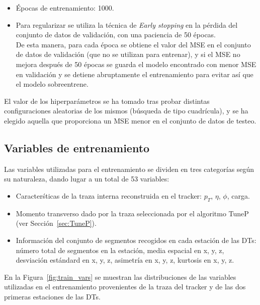 \begin{itemize}
\item \'Epocas de entrenamiento: 1000.

\item Para regularizar se utiliza la t\'ecnica de \textit{Early stopping} en la p\'erdida del conjunto de datos de validaci\'on, con una paciencia de 50 \'epocas. \\
De esta manera, para cada \'epoca se obtiene el valor del MSE en el conjunto de datos de validaci\'on (que no se utilizan para entrenar), y si el MSE no mejora despu\'es de 50 \'epocas se guarda el modelo encontrado con menor MSE en validaci\'on y se detiene abruptamente el entrenamiento para evitar as\'i que el modelo sobreentrene. 

\end{itemize}

El valor de los hiperpar\'ametros se ha tomado tras probar distintas configuraciones aleatorias de los mismos (b\'usqueda de tipo cuadr\'icula), y se ha elegido aquella que proporciona un MSE menor en el conjunto de datos de testeo.


\subsection{Variables de entrenamiento}\label{sec:variables}

Las variables utilizadas para el entrenamiento se dividen en tres categor\'ias seg\'un su naturaleza, dando lugar a un total de 53 variables:

\begin{itemize}
\item Caracter\'sticas de la traza interna reconstruida en el tracker: $p_{T}$, $\eta$, $\phi$, carga.
\item Momento transverso dado por la traza seleccionada por el algoritmo TuneP (ver Secci\'on~\ref{sec:TuneP}).
\item Informaci\'on del conjunto de segmentos recogidos en cada estaci\'on de las DTs: n\'umero total de segmentos en la estaci\'on, media espacial en x, y, z, desviaci\'on est\'andard en x, y, z, asimetr\'ia en x, y, z, kurtosis en x, y, z.
\end{itemize}

En la Figura~\ref{fig:train_vars} se muestran las distribuciones de las variables utilizadas en el entrenamiento provenientes de la traza del tracker y de las dos primeras estaciones de las DTs.

